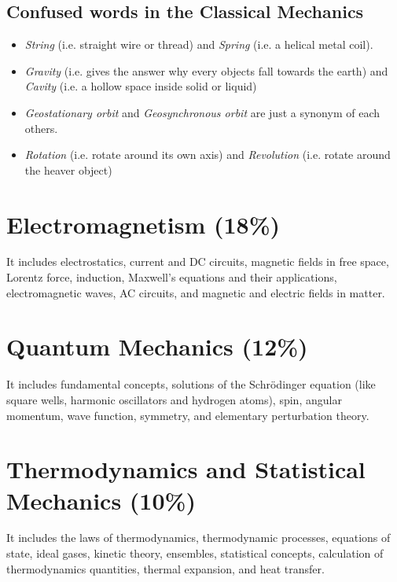 \documentclass[12pt,a4paper]{article}
\begin{document}
\subsection*{Confused words in the Classical Mechanics}

\begin{itemize}
\item \emph{String} (i.e. straight wire or thread) and \emph{Spring} (i.e. a helical metal coil).
\item \emph{Gravity} (i.e. gives the answer why every objects fall towards the earth) and \emph{Cavity} (i.e. a hollow space inside solid or liquid)
\item \emph{Geostationary orbit} and \emph{Geosynchronous orbit} are just a synonym of each others. 
\item \emph{Rotation} (i.e. rotate around its own axis) and \emph{Revolution} (i.e. rotate around the heaver object)
\end{itemize}
\section{Electromagnetism (18\%)}

It includes electrostatics, current and DC circuits, magnetic fields in free space, Lorentz force, induction, Maxwell's equations and their applications, electromagnetic waves, AC circuits, and magnetic and electric fields in matter.

\section{Quantum Mechanics (12\%)}

It includes fundamental concepts, solutions of the Schr\"{o}dinger equation (like square wells, harmonic oscillators and hydrogen atoms), spin, angular momentum, wave function, symmetry, and elementary perturbation theory.


\section{Thermodynamics and Statistical Mechanics (10\%)}

It includes the laws of thermodynamics, thermodynamic processes, equations of state, ideal gases, kinetic theory, ensembles, statistical concepts, calculation of thermodynamics quantities, thermal expansion, and heat transfer.
\end{document}
